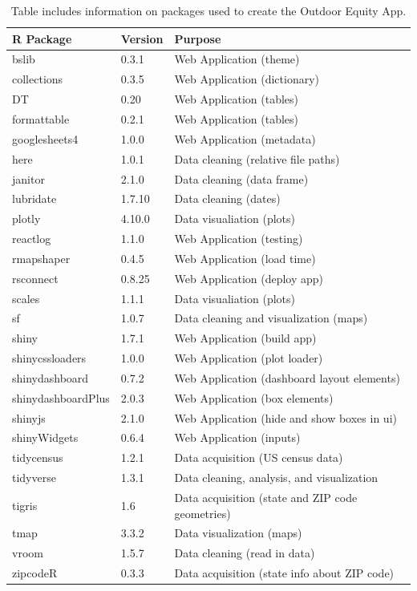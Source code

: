 \documentclass[
  11 pt,
  openany]{book}
\begin{document}
\begin{table}

\caption{\label{tab:unnamed-chunk-5}Table includes information on packages used to create the Outdoor Equity App.}
\begin{tabular}[t]{l|l|l}
\hline
R Package & Version & Purpose\\
\hline
bslib & 0.3.1 & Web Application (theme)\\
\hline
collections & 0.3.5 & Web Application (dictionary)\\
\hline
DT & 0.20 & Web Application (tables)\\
\hline
formattable & 0.2.1 & Web Application (tables)\\
\hline
googlesheets4 & 1.0.0 & Web Application (metadata)\\
\hline
here & 1.0.1 & Data cleaning (relative file paths)\\
\hline
janitor & 2.1.0 & Data cleaning (data frame)\\
\hline
lubridate & 1.7.10 & Data cleaning (dates)\\
\hline
plotly & 4.10.0 & Data visualiation (plots)\\
\hline
reactlog & 1.1.0 & Web Application (testing)\\
\hline
rmapshaper & 0.4.5 & Web Application (load time)\\
\hline
rsconnect & 0.8.25 & Web Application (deploy app)\\
\hline
scales & 1.1.1 & Data visualiation (plots)\\
\hline
sf & 1.0.7 & Data cleaning and visualization (maps)\\
\hline
shiny & 1.7.1 & Web Application (build app)\\
\hline
shinycssloaders & 1.0.0 & Web Application (plot loader)\\
\hline
shinydashboard & 0.7.2 & Web Application (dashboard layout elements)\\
\hline
shinydashboardPlus & 2.0.3 & Web Application (box elements)\\
\hline
shinyjs & 2.1.0 & Web Application (hide and show boxes in ui)\\
\hline
shinyWidgets & 0.6.4 & Web Application (inputs)\\
\hline
tidycensus & 1.2.1 & Data acquisition (US census data)\\
\hline
tidyverse & 1.3.1 & Data cleaning, analysis, and visualization\\
\hline
tigris & 1.6 & Data acquisition (state and ZIP code geometries)\\
\hline
tmap & 3.3.2 & Data visualization (maps)\\
\hline
vroom & 1.5.7 & Data cleaning (read in data)\\
\hline
zipcodeR & 0.3.3 & Data acquisition (state info about ZIP code)\\
\hline
\end{tabular}
\end{table}
\end{document}
